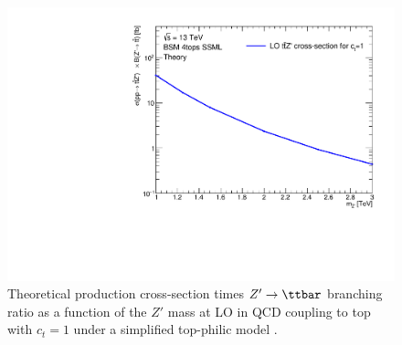 \documentclass[../thesis.tex]{subfiles}
\begin{document}
\begin{figure}[!htb]
\begin{center}
\includegraphics[width=0.8\linewidth]{fig/theory_ttZp_limit.pdf}
\caption{\label{fig:theory:tttt_channels}Theoretical \ttZp production cross-section times $Z'\rightarrow\ttbar$ branching ratio as a function of the $Z'$ mass at \acs{LO} in \acs{QCD} coupling to top with $c_t=1$ under a simplified top-philic model \citep{NewPhysicsWorkingGroup:2010hhy,theory:ttZp,theory:ttZp_LHC}.}
\end{center}
\end{figure}


%

\end{document}
